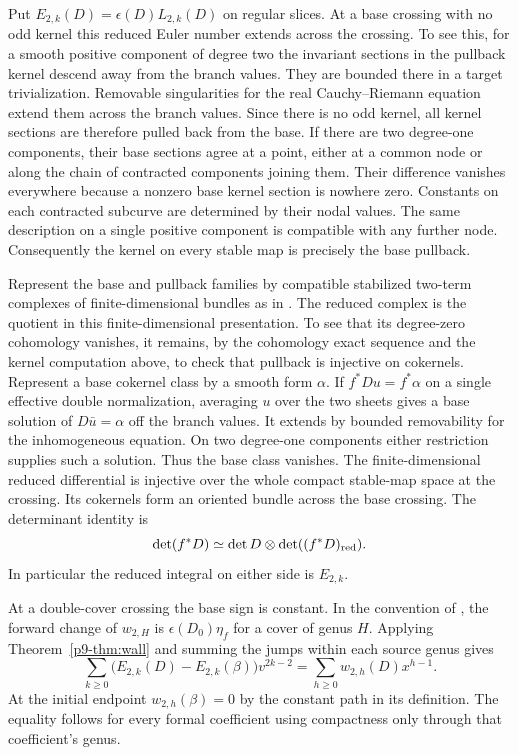 Put $E_{2,k}(D)=\epsilon(D)L_{2,k}(D)$ on regular slices. At a base
crossing with no odd kernel this reduced Euler number extends across
the crossing. To see this, for a smooth positive component of degree
two the invariant sections in the pullback kernel descend away from the
branch values. They are bounded there in a target trivialization.
Removable singularities for the real Cauchy--Riemann equation extend
them across the branch values. Since there is no odd kernel, all kernel
sections are therefore pulled back from the base. If there are two
degree-one components, their base sections agree at a point, either at
a common node or along the chain of contracted components joining
them. Their difference vanishes everywhere because a nonzero base
kernel section is nowhere zero. Constants on each contracted subcurve
are determined by their nodal values. The same description on a single
positive component is compatible with any further node. Consequently
the kernel on every stable map is precisely the base pullback.

Represent the base and pullback families by compatible stabilized
two-term complexes of finite-dimensional bundles as in
\cite[Appendix~B, (B.7)--(B.10)]{bai}. The reduced complex is the
quotient in this finite-dimensional presentation. To see that its
degree-zero cohomology vanishes, it remains, by the cohomology exact
sequence and the kernel computation above, to check that pullback
is injective on cokernels. Represent a base cokernel class by a smooth
form $\alpha$. If $f^*D u=f^*\alpha$ on a single effective double
normalization, averaging $u$ over the two sheets gives a base solution
of $D\bar u=\alpha$ off the branch values. It extends by bounded
removability for the inhomogeneous equation. On two degree-one components
either restriction supplies such a solution. Thus the base class
vanishes. The finite-dimensional reduced differential is injective
over the whole compact stable-map space at the crossing.
Its cokernels form an oriented bundle across the base crossing. The
determinant identity is
\[
 \det(f^*D)\simeq\det D\otimes\det((f^*D)_{\rm red}).
\]
In particular the reduced integral on either side is $E_{2,k}$.

At a double-cover crossing the base sign is constant. In the convention
of \cite[(5.59)--(5.60)]{bai}, the forward change of $w_{2,H}$ is
$\epsilon(D_0)\eta_f$ for a cover of genus $H$. Applying
Theorem~\ref{p9-thm:wall} and summing the jumps within each source genus
gives
\begin{equation}\label{p9-eq:transport}
 \sum_{k\ge0}\bigl(E_{2,k}(D)-E_{2,k}(\beta)\bigr)v^{2k-2}
       =\sum_{h\ge0} w_{2,h}(D)x^{h-1}.
\end{equation}
At the initial endpoint $w_{2,h}(\beta)=0$ by the constant path in its
definition. The equality follows for every formal coefficient using
compactness only through that coefficient's genus.


